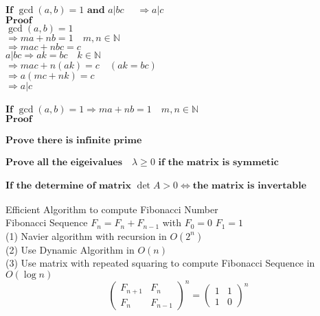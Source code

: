 \documentclass[10pt]{article}
\begin{document}
$\textbf{If }  \gcd(a, b) = 1 \textbf{ and }  a \vert bc \quad$  $\Rightarrow a \vert c$ \\
$\textbf{Proof}$ \\
$\gcd(a, b) = 1  $\\
$\Rightarrow ma+nb = 1\quad m, n \in \mathbb{N} $ \\
$\Rightarrow mac + nbc = c$ \\
$a \vert bc \Rightarrow ak = bc \quad k \in \mathbb{N} $ \\
$\Rightarrow mac + n(ak)=c \quad    (ak=bc) $ \\
$\Rightarrow a(mc + nk) = c$  \\
$\Rightarrow a \vert c $ \\
\\
$\textbf{If } \gcd(a, b) = 1 \Rightarrow ma + nb = 1 \quad m, n \in \mathbb{N}$\\
$\textbf{Proof}$\\
\\
$\textbf{Prove there is infinite prime}$\\
\\
$\textbf{Prove all the eigeivalues}\quad  \lambda \geq  0  \textbf{ if the matrix is symmetic}$\\
\\
$\textbf{If the determine of matrix } \det{A} > 0 \iff \textbf{the matrix is invertable}$\\
\\
Efficient Algorithm to compute Fibonacci Number \\
Fibonacci Sequence   
$F_{n} = F_{n} + F_{n-1}$ with $F_{0} = 0$
$F_{1} = 1$ \\
(1) Navier algorithm with recursion in $O(2^n)$ \\
(2) Use Dynamic Algorithm in $O(n)$\\
(3) Use matrix with repeated squaring to compute Fibonacci Sequence in $O(\log{n})$
\[\left(\begin{array}{cc} F_{n+1} & F_{n} \\ F_{n} & F_{n-1} \end{array} \right)^n =  \left(\begin{array}{cc}1 & 1 \\ 1 & 0 \end{array} \right)^n \]
\\
\newpage
\end{document}
